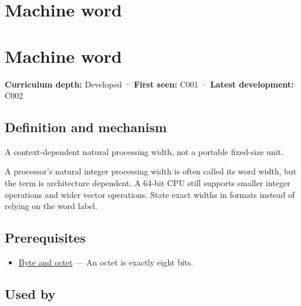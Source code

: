 \hypertarget{appendix-d67a19507dc5}{}
\section*{Machine word}
\section{Machine word}\label{appendix-d67a19507dc5-machine-word}

\textbf{Curriculum depth:} Developed · \textbf{First seen:} C001 · \textbf{Latest development:} C002

\subsection{Definition and mechanism}\label{appendix-d67a19507dc5-definition-and-mechanism}

A context-dependent natural processing width, not a portable fixed-size unit.

A processor's natural integer processing width is often called its word width, but the term is architecture dependent. A 64-bit CPU still supports smaller integer operations and wider vector operations. State exact widths in formats instead of relying on the word label.

\subsection{Prerequisites}\label{appendix-d67a19507dc5-prerequisites}

\begin{itemize}
\tightlist
\item
  \hyperref[appendix-5bee2df85484]{Byte and octet} --- An octet is exactly eight bits.
\end{itemize}

\subsection{Used by}\label{appendix-d67a19507dc5-used-by}

